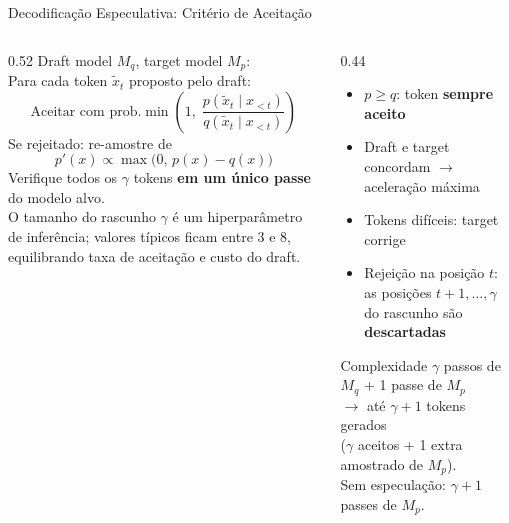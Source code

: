 \documentclass[aspectratio=169, xcolor=dvipsnames]{beamer}
\begin{document}
  \begin{frame}{Decodificação Especulativa: Critério de Aceitação}
    \begin{columns}[T]
      \begin{column}{0.52\textwidth}
        Draft model $M_q$, target model $M_p$:\\[0.1em]
        Para cada token $\tilde{x}_t$ proposto pelo draft:
        \[
          \text{Aceitar com prob.} \min\!\left(1,\; \frac{p(\tilde{x}_t \mid x_{<t})}{q(\tilde{x}_t \mid x_{<t})}\right)
        \]
        Se rejeitado: re-amostre de
        \[
          p'(x) \propto \max\!\bigl(0,\, p(x)-q(x)\bigr)
        \]
        Verifique todos os $\gamma$ tokens \textbf{em um único passe} do modelo alvo.\\[0.1em]
        {\footnotesize O tamanho do rascunho $\gamma$ é um hiperparâmetro de inferência; valores típicos ficam entre 3 e 8, equilibrando taxa de aceitação e custo do draft.}
      \end{column}
      \begin{column}{0.44\textwidth}
        \begin{itemize}
          \item $p \ge q$: token \textbf{sempre aceito}
          \item Draft e target concordam $\to$ aceleração máxima
          \item Tokens difíceis: target corrige
          \item Rejeição na posição $t$: as posições $t{+}1, \ldots, \gamma$ do rascunho são \textbf{descartadas}
        \end{itemize}
        \vspace{-0.2em}
        \begin{block}{Complexidade}
          $\gamma$ passos de $M_q$ + 1 passe de $M_p$\\
          $\to$ até $\gamma+1$ tokens gerados\\
          ($\gamma$ aceitos + 1 extra amostrado de $M_p$).\\
          Sem especulação: $\gamma+1$ passes de $M_p$.
        \end{block}
      \end{column}
    \end{columns}
  \end{frame}
\end{document}

